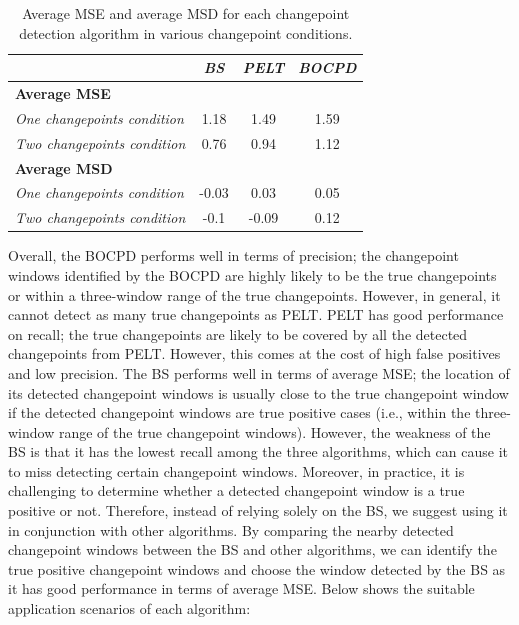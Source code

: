 \documentclass[]{interact}
\theoremstyle{plain}%
\theoremstyle{definition}
\theoremstyle{remark}
\begin{document}
    \begin{table}[H]
    	\centering
    	\renewcommand{\arraystretch}{1.2} %
    	\small
    	\caption{Average MSE and average MSD for each changepoint detection algorithm in various changepoint conditions.}
    	\begin{tabular}{lccc}
    		\hline
    		& \textit{BS} & \textit{PELT} & \textit{BOCPD} \\ \hline
    		\textbf{Average MSE}               &             &               &                \\
    		\textit{One changepoints condition} & 1.18        & 1.49          & 1.59           \\
    		\textit{Two changepoints condition} & 0.76        & 0.94          & 1.12           \\
    		\textbf{Average MSD}               &             &               &                \\
    		\textit{One changepoints condition} & -0.03       & 0.03          & 0.05           \\
    		\textit{Two changepoints condition} & -0.1        & -0.09          & 0.12          \\ \hline
    	\end{tabular}
    	\label{Avg_MSEMSD}
    \end{table}

    Overall, the BOCPD performs well in terms of precision; the changepoint windows identified by the BOCPD are highly likely to be the true changepoints or within a three-window range of the true changepoints. However, in general, it cannot detect as many true changepoints as PELT. PELT has good performance on recall; the true changepoints are likely to be covered by all the detected changepoints from PELT. However, this comes at the cost of high false positives and low precision. The BS performs well in terms of average MSE; the location of its detected changepoint windows is usually close to the true changepoint window if the detected changepoint windows are true positive cases (i.e., within the three-window range of the true changepoint windows). However, the weakness of the BS is that it has the lowest recall among the three algorithms, which can cause it to miss detecting certain changepoint windows. Moreover, in practice, it is challenging to determine whether a detected changepoint window is a true positive or not. Therefore, instead of relying solely on the BS, we suggest using it in conjunction with other algorithms. By comparing the nearby detected changepoint windows between the BS and other algorithms, we can identify the true positive changepoint windows and choose the window detected by the BS as it has good performance in terms of average MSE. Below shows the suitable application scenarios of each algorithm:
    
\end{document}
